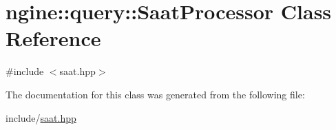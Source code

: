 \hypertarget{classngine_1_1query_1_1SaatProcessor}{}\section{ngine\+:\+:query\+:\+:Saat\+Processor Class Reference}
\label{classngine_1_1query_1_1SaatProcessor}


{\ttfamily \#include $<$saat.\+hpp$>$}



The documentation for this class was generated from the following file\+:\begin{DoxyCompactItemize}
\item 
include/\hyperlink{saat_8hpp}{saat.\+hpp}\end{DoxyCompactItemize}
